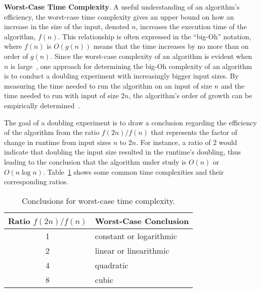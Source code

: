 {\bf Worst-Case Time Complexity}. A useful understanding of an algorithm's efficiency, the worst-case time complexity
gives an upper bound on how an increase in the size of the input, denoted $n$, increases the execution time of the
algorithm, $f(n)$.  This relationship is often expressed in the ``big-Oh'' notation, where $f(n)$ is $O(g(n))$ means
that the time increases by no more than on order of $g(n)$. Since the worst-case complexity of an algorithm is evident
when $n$ is large~\cite{goodrich2014}, one approach for determining the big-Oh complexity of an algorithm is to conduct
a doubling experiment with increasingly bigger input sizes. By measuring the time needed to run the algorithm on an
input of size $n$ and the time needed to run with input of size $2n$, the algorithm's order of growth can be
empirically determined~\cite{mcgeoch2012,sedgewick1998}.

The goal of a doubling experiment is to draw a conclusion regarding the efficiency of the algorithm from the ratio
$f(2n)/f(n)$ that represents the factor of change in runtime from input sizes $n$ to $2n$. For instance, a ratio of $2$
would indicate that doubling the input size resulted in the runtime's doubling, thus leading to the conclusion that the
algorithm under study is $O(n)$ or $O(n\log n)$.  Table~\ref{table:ratios} shows some common time complexities and their
corresponding ratios.

\begin{table}[t]

  \begin{center}

    \begin{tabular}{c|l}
      Ratio $f(2n)/f(n)$ & Worst-Case Conclusion              \\ \hline
      1                  & constant or logarithmic \\
      2                  & linear or linearithmic  \\
      4                  & quadratic               \\
      8                  & cubic                   \\
    \end{tabular}

  \end{center}
  \vspace*{-.25in}

  \caption{Conclusions for worst-case time complexity.}~\label{table:ratios}
  \vspace*{-.35in}

\end{table}

